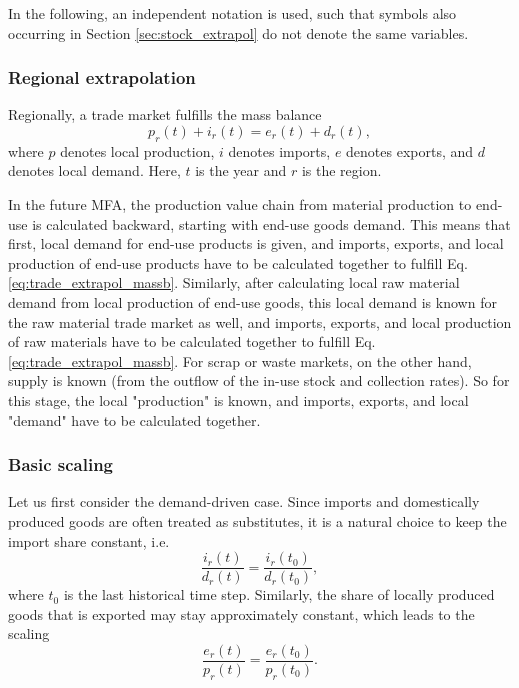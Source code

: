 In the following, an independent notation is used, such that symbols also occurring in Section \ref{sec:stock_extrapol} do not denote the same variables.

\subsubsection{Regional extrapolation}

Regionally, a trade market fulfills the mass balance
\begin{equation} \label{eq:trade_extrapol_massb}
    p_r(t) + i_r(t) = e_r(t) + d_r(t),
\end{equation}
where $p$ denotes local production, $i$ denotes imports, $e$ denotes exports, and $d$ denotes local demand. Here, $t$ is the year and $r$ is the region.

In the future MFA, the production value chain from material production to end-use is calculated backward, starting with end-use goods demand.
This means that first, local demand for end-use products is given, and imports, exports, and local production of end-use products have to be calculated together to fulfill Eq. \eqref{eq:trade_extrapol_massb}.
Similarly, after calculating local raw material demand from local production of end-use goods, this local demand is known for the raw material trade market as well, and imports, exports, and local production of raw materials have to be calculated together to fulfill Eq. \eqref{eq:trade_extrapol_massb}.
For scrap or waste markets, on the other hand, supply is known (from the outflow of the in-use stock and collection rates). So for this stage, the local "production" is known, and imports, exports, and local "demand" have to be calculated together.

\subsubsection{Basic scaling}

Let us first consider the demand-driven case. Since imports and domestically produced goods are often treated as substitutes, it is a natural choice to keep the import share constant, i.e.
\begin{equation} \label{eq:import_scaling_basic}
    \frac{i_r(t)}{d_r(t)} = \frac{i_r(t_{0})}{d_r(t_{0})},
\end{equation}
where $t_{0}$ is the last historical time step. Similarly, the share of locally produced goods that is exported may stay approximately constant, which leads to the scaling
\begin{equation} \label{eq:export_scaling_basic}
    \frac{e_r(t)}{p_r(t)} =  \frac{e_r(t_{0})}{p_r(t_{0})}.
\end{equation}

